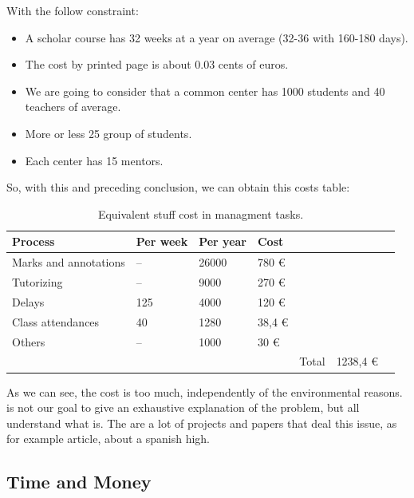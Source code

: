 With the follow constraint:

\begin{itemize}
  \setlength{\itemsep}{0pt}
\item A scholar course has 32 weeks at a year on average (32-36 with 160-180 days).
\item The cost by printed page is about 0.03 cents of euros.
\item We are going to consider that a common center has 1000 students and 40 teachers of average.
\item More or less 25 group of students.
\item Each center has 15 mentors.
\end{itemize}

So, with this and preceding conclusion, we can obtain this costs table:

\begin{table}[H]
\centering

\begin{tabular}{@{}lllllll@{}}

Process & Per week  & Per year  & Cost  \\
\midrule

Marks and annotations   &  --  &  26000  &   780      \euro  \\
Tutorizing              &  --  &  9000   &   270      \euro  \\
Delays                  &  125 &  4000   &   120      \euro  \\
Class attendances       &  40  &  1280   &   38,4     \euro  \\
Others                  &  --  &  1000   &   30       \euro  \\

\midrule
& & & & Total & 1238,4 \euro \\
\end{tabular}
\caption{Equivalent stuff cost in managment tasks. }
\label{my-label}
\end{table}


\noindent As we can see, the cost is too much, independently of the environmental reasons.
is not our goal to give an exhaustive explanation of the problem, but all understand what is.
The are a lot of projects and papers that deal this issue, as for example \cite{paperconsumption}
article, about a spanish high.

\subsection{Time and Money}

